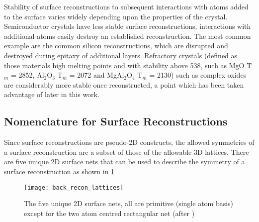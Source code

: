Stability of surface reconstructions to subsequent interactions with atoms added to the surface varies widely depending upon the properties of the crystal. Semiconductor crystals have less stable surface reconstructions, interactions with additional atoms easily destroy an established reconstruction. The most common example are the common silicon reconstructions, which are disrupted and destroyed during epitaxy of additional layers. Refractory crystals (defined as those materials high melting points and with stability above 538\celsius{}\cite{ASTMC71}, such as MgO T$_m$ = 2852\celsius{}, Al$_2$O$_3$ T$_m$ = 2072\celsius{} and MgAl$_2$O$_4$ T$_m$ = 2130\celsius{}) such as complex oxides are considerably more stable once reconstructed, a point which has been taken advantage of later in this work.

\subsection{Nomenclature for Surface Reconstructions}
Since surface reconstructions are pseudo-2D constructs, the allowed symmetries of a surface reconstruction are a subset of those of the allowable 3D lattices. There are five unique 2D surface nets that can be used to describe the symmetry of a surface reconstruction as shown in \cref{fig:back_recon_lattices}
\begin{figure}
    \centering
    \texttt{[image: back\_recon\_lattices]}
    \caption[2D Surface Nets]{\label{fig:back_recon_lattices}The five unique 2D surface nets, all are primitive (single atom basis) except for the two atom centred rectangular net (after \cite{ohring2001materials})}
\end{figure}

